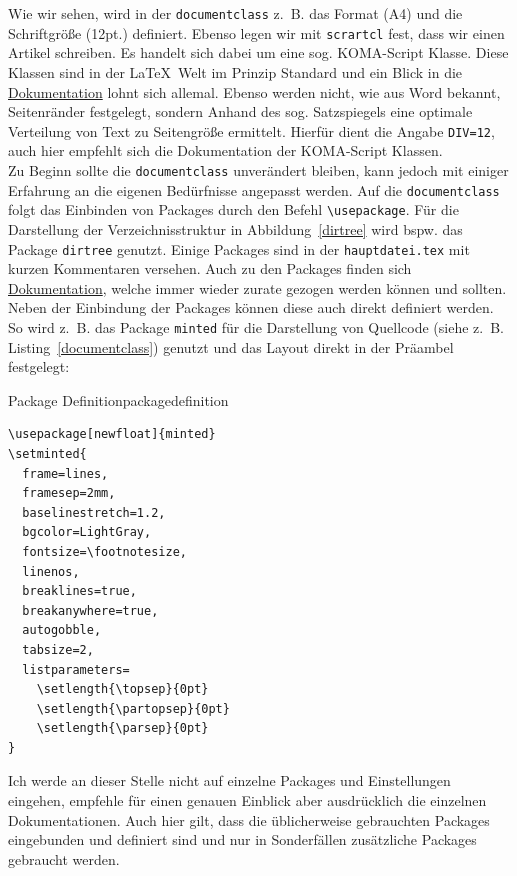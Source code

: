 Wie wir sehen, wird in der \texttt{documentclass} z. B. das Format (A4) und die
Schriftgröße (12pt.) definiert. Ebenso legen wir mit \texttt{scrartcl} fest,
dass wir einen Artikel schreiben. Es handelt sich dabei um eine sog. KOMA-Script
Klasse. Diese Klassen sind in der \LaTeX~Welt im Prinzip Standard und ein Blick
in die
\href{https://ftp.agdsn.de/pub/mirrors/latex/dante/macros/latex/contrib/koma-script/doc/scrguide-de.pdf}{Dokumentation}
lohnt sich allemal. Ebenso werden nicht, wie aus Word bekannt, Seitenränder
festgelegt, sondern Anhand des sog. Satzspiegels eine optimale Verteilung von
Text zu Seitengröße ermittelt. Hierfür dient die Angabe \texttt{DIV=12}, auch
hier empfehlt sich die Dokumentation der KOMA-Script Klassen.\\ Zu Beginn sollte
die \texttt{documentclass} unverändert bleiben, kann jedoch mit einiger Erfahrung an die
eigenen Bedürfnisse angepasst werden. Auf die
\texttt{documentclass} folgt das Einbinden von Packages durch den Befehl
\texttt{\textbackslash usepackage}. Für die Darstellung der Verzeichnisstruktur
in Abbildung~\ref{dirtree} wird bspw. das Package \texttt{dirtree} genutzt.
Einige Packages sind in der \texttt{hauptdatei.tex} mit kurzen Kommentaren
versehen. Auch zu den Packages finden sich
\href{https://www.ctan.org}{Dokumentation}, welche immer wieder zurate
gezogen werden können und sollten. Neben der Einbindung der Packages können
diese auch direkt definiert werden. So wird z. B. das Package \texttt{minted}
für die Darstellung von Quellcode (siehe z. B. Listing~\ref{documentclass})
genutzt und das Layout direkt in der Präambel festgelegt:

\begin{code}{Package Definition}{packagedefinition}
	\begin{verbatim}
\usepackage[newfloat]{minted}
\setminted{
  frame=lines,
  framesep=2mm,
  baselinestretch=1.2,
  bgcolor=LightGray,
  fontsize=\footnotesize,
  linenos,
  breaklines=true,
  breakanywhere=true,
  autogobble,
  tabsize=2,
  listparameters=
    \setlength{\topsep}{0pt}
    \setlength{\partopsep}{0pt}
    \setlength{\parsep}{0pt}
}
	\end{verbatim}
\end{code}

Ich werde an dieser Stelle nicht auf einzelne Packages und Einstellungen
eingehen, empfehle für einen genauen Einblick aber ausdrücklich die einzelnen
Dokumentationen. Auch hier gilt, dass die üblicherweise gebrauchten Packages
eingebunden und definiert sind und nur in Sonderfällen zusätzliche Packages
gebraucht werden.

